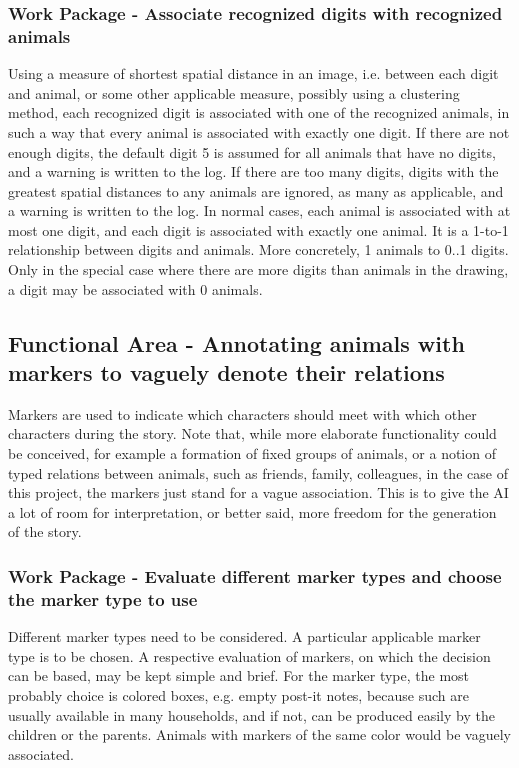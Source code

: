 \subsubsection{Work Package - Associate recognized digits with recognized animals}
Using a measure of shortest spatial distance in an image, i.e. between each digit and animal, or some other applicable measure, possibly using a clustering method, each recognized digit is associated with one of the recognized animals, in such a way that every animal is associated with exactly one digit.
If there are not enough digits, the default digit 5 is assumed for all animals that have no digits, and a warning is written to the log. If there are too many digits, digits with the greatest spatial distances to any animals are ignored, as many as applicable, and a warning is written to the log.
In normal cases, each animal is associated with at most one digit, and each digit is associated with exactly one animal.
It is a 1-to-1 relationship between digits and animals.
More concretely, 1 animals to 0..1 digits.
Only in the special case where there are more digits than animals in the drawing, a digit may be associated with 0 animals.



\subsection{Functional Area - Annotating animals with markers to vaguely denote their relations}
Markers are used to indicate which characters should meet with which other characters during the story.
Note that, while more elaborate functionality could be conceived, for example a formation of fixed groups of animals, or a notion of typed relations between animals, such as friends, family, colleagues, in the case of this project, the markers just stand for a vague association.
This is to give the AI a lot of room for interpretation, or better said, more freedom for the generation of the story.

\subsubsection{Work Package - Evaluate different marker types and choose the marker type to use}
Different marker types need to be considered.
A particular applicable marker type is to be chosen.
A respective evaluation of markers, on which the decision can be based, may be kept simple and brief.
For the marker type, the most probably choice is colored boxes, e.g. empty post-it notes, because such are usually available in many households, and if not, can be produced easily by the children or the parents.
Animals with markers of the same color would be vaguely associated.

